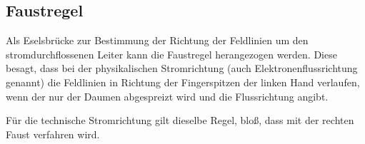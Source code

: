 




%
%	





\subsection{Faustregel}	\label{subsec:Faustregel}

Als Eselsbrücke zur Bestimmung der Richtung der Feldlinien um den stromdurchflossenen Leiter kann die Faustregel herangezogen werden. Diese besagt, dass bei der physikalischen Stromrichtung (auch Elektronenflussrichtung genannt) die Feldlinien in Richtung der Fingerspitzen der linken Hand verlaufen, wenn der nur der Daumen abgespreizt wird und die Flussrichtung angibt.

Für die technische Stromrichtung gilt dieselbe Regel, bloß, dass mit der rechten Faust verfahren wird.

